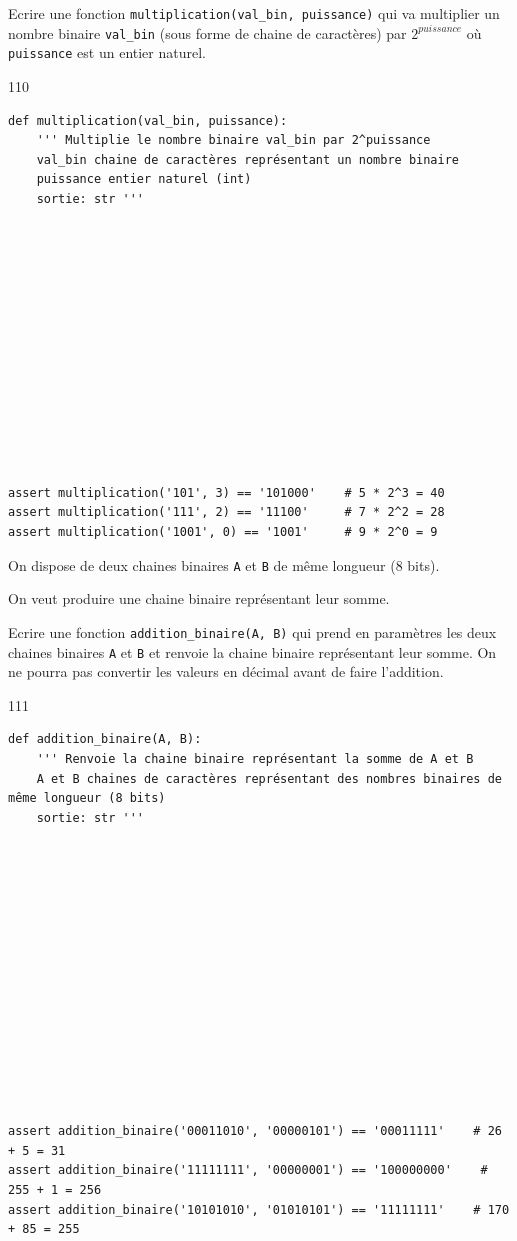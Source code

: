 \documentclass[a4paper,10pt]{report}
\begin{document}
Ecrire une fonction \verb|multiplication(val_bin, puissance)| qui va multiplier un nombre binaire \verb|val_bin| (sous forme de chaine de caractères) par $2^{puissance}$ où \verb|puissance| est un entier naturel.
    \begin{answer}{1}{10}
\begin{verbatim}
def multiplication(val_bin, puissance):
    ''' Multiplie le nombre binaire val_bin par 2^puissance
    val_bin chaine de caractères représentant un nombre binaire
    puissance entier naturel (int)
    sortie: str '''














assert multiplication('101', 3) == '101000'    # 5 * 2^3 = 40
assert multiplication('111', 2) == '11100'     # 7 * 2^2 = 28
assert multiplication('1001', 0) == '1001'     # 9 * 2^0 = 9
    \end{verbatim}

    \end{answer}

    \pagebreak
    \thispagestyle{DS_LP}


    On dispose de deux chaines binaires \verb|A| et \verb|B| de même longueur (8 bits).

    On veut produire une chaine binaire représentant leur somme.

    Ecrire une fonction \verb|addition_binaire(A, B)| qui prend en paramètres les deux chaines binaires \verb|A| et \verb|B| et renvoie la chaine binaire représentant leur somme. On ne pourra pas convertir les valeurs en décimal avant de faire l'addition.

\begin{answer}{1}{11} 
\begin{verbatim}
def addition_binaire(A, B):
    ''' Renvoie la chaine binaire représentant la somme de A et B
    A et B chaines de caractères représentant des nombres binaires de même longueur (8 bits)
    sortie: str '''















assert addition_binaire('00011010', '00000101') == '00011111'    # 26 + 5 = 31
assert addition_binaire('11111111', '00000001') == '100000000'    # 255 + 1 = 256
assert addition_binaire('10101010', '01010101') == '11111111'    # 170 + 85 = 255
    \end{verbatim}

    \end{answer}
\end{document}
